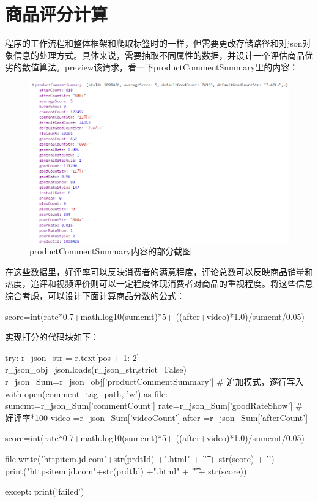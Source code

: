\section{商品评分计算}
程序的工作流程和整体框架和爬取标签时的一样，但需要更改存储路径和对json对象信息的处理方式。具体来说，需要抽取不同属性的数据，并设计一个评估商品优劣的数值算法。preview该请求，看一下productCommentSummary里的内容：

\begin{figure}[htbp]
\centering
\includegraphics[width=13.5cm]{img/yhb/data_eg_jd.png}
\caption{productCommentSummary内容的部分截图}
\end{figure}

在这些数据里，好评率可以反映消费者的满意程度，评论总数可以反映商品销量和热度，追评和视频评价则可以一定程度体现消费者对商品的重视程度。将这些信息综合考虑，可以设计下面计算商品分数的公式：

\begin{python}
score=int(rate*0.7+math.log10(sumcmt)*5+
                          ((after+video)*1.0)/sumcmt/0.05)
\end{python}

实现打分的代码块如下：
\begin{python}
    try:
        r_json_str = r.text[pos + 1:-2]
        r_json_obj=json.loads(r_json_str,strict=False)
        r_json_Sum=r_json_obj['productCommentSummary']
        # 追加模式，逐行写入
        with open(comment_tag_path, 'w') as file:
            sumcmt=r_json_Sum['commentCount']
            rate=r_json_Sum['goodRateShow'] # 好评率*100
            video =r_json_Sum['videoCount']
            after =r_json_Sum['afterCount']

            score=int(rate*0.7+math.log10(sumcmt)*5+
                          ((after+video)*1.0)/sumcmt/0.05)


            file.write("httpitem.jd.com"+str(prdtId) +".html"
                       + '\t' + str(score) + '\n')
            print("httpsitem.jd.com"+str(prdtId) +".html"
                       + '\t' + str(score))

    except:
        print('failed')
\end{python}

